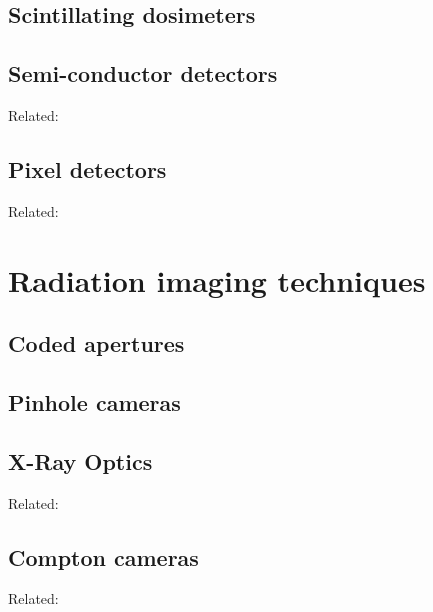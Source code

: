 \documentclass[a4paper,11pt,titlepage,twoside]{book}
\begin{document}

\subsection{Scintillating dosimeters}

\subsection{Semi-conductor detectors}

Related: \cite{urban2017vzlusat}

\subsection{Pixel detectors}

Related: \cite{baca2016miniaturized, baca2019timepix, baca2018rospix, baca2018vzlusat}


\section{Radiation imaging techniques}


\subsection{Coded apertures}

\subsection{Pinhole cameras}

\subsection{X-Ray Optics}

Related: \cite{baca2016miniaturized}

\subsection{Compton cameras}

Related: \cite{baca2019timepix}



\end{document}
